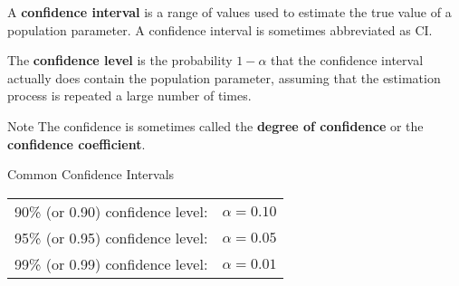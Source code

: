 \documentclass{beamer}
\begin{document}
\begin{frame}
\begin{definition}
A \textbf{confidence interval} is a range of values used to estimate the true value of a population parameter. A confidence interval is sometimes abbreviated as CI\@.
\end{definition}\pause

\begin{definition}
The \textbf{confidence level} is the probability $1-\alpha$ that the confidence interval actually does contain the population parameter, assuming that the estimation process is repeated a large number of times.
\end{definition}\pause

\begin{block}{Note}
The confidence is sometimes called the \textbf{degree of confidence} or the \textbf{confidence coefficient}.
\end{block}\pause

\begin{block}{Common Confidence Intervals}
\begin{center}
\begin{tabular}{cc}
90\% (or 0.90) confidence level: & $\alpha=0.10$ \\
95\% (or 0.95) confidence level: & $\alpha=0.05$ \\
99\% (or 0.99) confidence level: & $\alpha=0.01$ \\
\end{tabular}
\end{center}
\end{block}
\end{frame}
\end{document}
